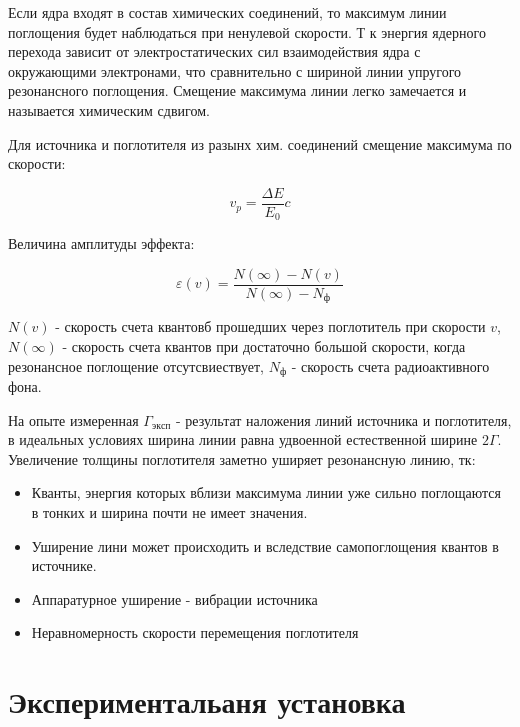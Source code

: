 \documentclass[a4paper]{article}
\begin{document}
Если ядра входят в состав химических соединений, то максимум линии поглощения будет наблюдаться при ненулевой скорости.
Т к энергия ядерного перехода зависит от электростатических сил взаимодействия ядра с окружающими электронами, что сравнительно с шириной линии упругого 
резонансного поглощения. Смещение максимума линии легко замечается и называется химическим сдвигом. \par 

Для источника и поглотителя из разынх хим. соединений смещение максимума по скорости:

\begin{equation}
    v_p = \frac{\Delta E}{E_0} c
\end{equation}

Величина амплитуды эффекта:

\begin{equation}
    \varepsilon (v) = \frac{N(\infty) - N(v)}{N(\infty) - N_ф}
\end{equation}

$N(v)$ - скорость счета квантовб прошедших через поглотитель при скорости $v$, $N(\infty)$ - скорость счета квантов при достаточно большой скорости, когда резонансное поглощение отсутсвиествует,
$N_ф$ - скорость счета радиоактивного фона. \par 

На опыте измеренная $\Gamma_{эксп}$ - результат наложения линий источника и поглотителя, в идеальных условиях ширина линии равна удвоенной естественной ширине $2 \Gamma$.
Увеличение толщины поглотителя заметно уширяет резонансную линию, тк:

\begin{itemize}
    \item Кванты, энергия которых вблизи максимума линии уже сильно поглощаются в тонких и ширина почти не имеет значения.
    \item Уширение лини может происходить и вследствие самопоглощения квантов в источнике.
    \item Аппаратурное уширение - вибрации источника
    \item Неравномерность скорости перемещения поглотителя
\end{itemize}


\section{Экспериментальаня установка}
\end{document}
